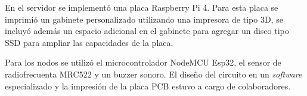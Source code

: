 En el servidor se implementó una placa Raspberry Pi 4. Para esta placa se imprimió un gabinete personalizado utilizando una impresora de tipo 3D, se incluyó además un espacio adicional en el gabinete para agregar un disco tipo SSD para ampliar las capacidades de la placa.

Para los nodos se utilizó el microcontrolador NodeMCU Esp32, el sensor de radiofrecuenta MRC522 y un buzzer sonoro. El diseño del circuito en un \textit{software} especializado y la impresión de la placa PCB estuvo a cargo de colaboradores.  










	
		

		
		
		
		



